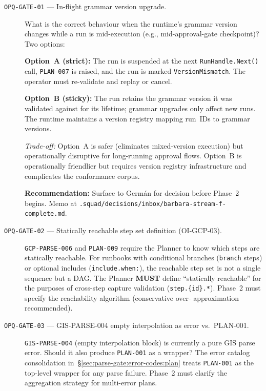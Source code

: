 \begin{description}
  \item[\texttt{OPQ-GATE-01} — In-flight grammar version upgrade.]
    What is the correct behaviour when the runtime's grammar version changes
    while a run is mid-execution (e.g., mid-approval-gate checkpoint)?  Two
    options:

    \textbf{Option~A (strict):} The run is suspended at the next
    \texttt{RunHandle.Next()} call, \texttt{PLAN-007} is raised, and the run
    is marked \texttt{VersionMismatch}.  The operator must re-validate and
    replay or cancel.

    \textbf{Option~B (sticky):} The run retains the grammar version it was
    validated against for its lifetime; grammar upgrades only affect new runs.
    The runtime maintains a version registry mapping run~IDs to grammar
    versions.

    \textit{Trade-off:} Option~A is safer (eliminates mixed-version execution)
    but operationally disruptive for long-running approval flows.  Option~B is
    operationally friendlier but requires version registry infrastructure and
    complicates the conformance corpus.

    \textbf{Recommendation:} Surface to Germán for decision before Phase~2
    begins.  Memo at \texttt{.squad/decisions/inbox/barbara-stream-f-complete.md}.

  \item[\texttt{OPQ-GATE-02} — Statically reachable step set definition
    (OI-GCP-03).]
    \texttt{GCP-PARSE-006} and \texttt{PLAN-009} require the Planner to know
    which steps are statically reachable.  For runbooks with conditional
    branches (\texttt{branch} steps) or optional includes
    (\texttt{include.when:}), the reachable step set is not a single sequence
    but a DAG.  The Planner \textbf{MUST} define ``statically reachable'' for
    the purposes of cross-step capture validation (\texttt{step.\{id\}.*}).
    Phase~2 must specify the reachability algorithm (conservative over-
    approximation recommended).

  \item[\texttt{OPQ-GATE-03} — GIS-PARSE-004 empty interpolation as
    error vs.\ PLAN-001.]
    \texttt{GIS-PARSE-004} (empty interpolation block) is currently a pure
    GIS parse error.  Should it also produce \texttt{PLAN-001} as a wrapper?
    The error catalog consolidation in~\S\ref{sec:parse-gate:error-codes:plan}
    treats \texttt{PLAN-001} as the top-level wrapper for any parse failure.
    Phase~2 must clarify the aggregation strategy for multi-error plans.


\end{description}
